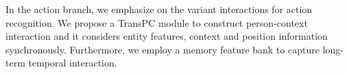 \documentclass[final]{cvpr}
\begin{document}
In the action branch, we emphasize on the variant interactions for action recognition. We propose a TransPC module to construct person-context interaction and it considers entity features, context and position information synchronously. Furthermore, we employ a memory feature bank to capture long-term temporal interaction.
\vspace{-2mm}
\end{document}
